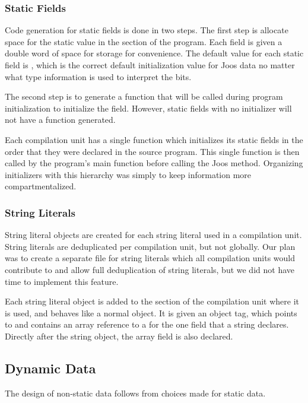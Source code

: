 \documentclass[pdftex,10pt,a4paper]{article}
\begin{document}
\subsubsection{Static Fields}

Code generation for static fields is done in two steps. The first step
is allocate space for the static value in the  section of
the program. Each field is given a double word of space for storage
for convenience. The default value for each static field is ,
which is the correct default initialization value for Joos data no
matter what type information is used to interpret the bits.

The second step is to generate a function that will be called during
program initialization to initialize the field. However, static fields
with no initializer will not have a function generated.

Each compilation unit has a single function which initializes its
static fields in the order that they were declared in the source
program. This single function is then called by the program's main
function before calling the Joos  method. Organizing
initializers with this hierarchy was simply to keep information more
compartmentalized.

\subsubsection{String Literals}

String literal objects are created for each string literal used in a
compilation unit. String literals are deduplicated per compilation
unit, but not globally. Our plan was to create a separate file for
string literals which all compilation units would contribute to and
allow full deduplication of string literals, but we did not have time
to implement this feature.

Each string literal object is added to the  section of the
compilation unit where it is used, and behaves like a normal
object. It is given an object tag, which points to
 and contains an array reference to a
 for the one field that a string declares. Directly after
the string object, the array field is also declared.

\subsection{Dynamic Data}

The design of non-static data follows from choices made for static
data.
\end{document}
